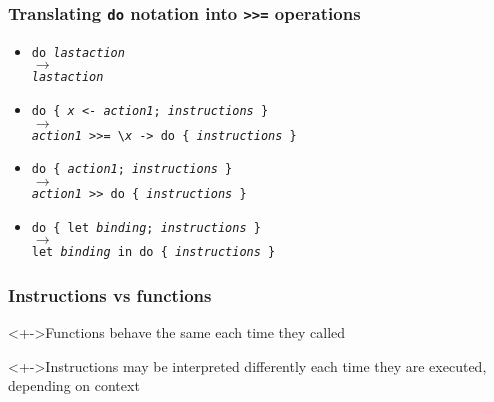 \documentclass{beamer}
\begin{document}
\begin{frame}
  \frametitle{Translating \texttt{do} notation into \texttt{>>=} operations}
  \begin{itemize}
  \item \texttt{do \emph{lastaction}}
    \\ $\longrightarrow$
    \\ \texttt{\emph{lastaction}}
    \\[2ex]
  \item \texttt{do \{ \emph{x} <- \emph{action1}; \emph{instructions} \}}
    \\ $\longrightarrow$
    \\ \texttt{\emph{action1} >>= \textbackslash \emph{x} -> \texttt{do \{ \emph{instructions} \}}}
    \\[2ex]
  \item \texttt{do \{ \emph{action1}; \emph{instructions} \}}
    \\ $\longrightarrow$
    \\ \texttt{\emph{action1} >> \texttt{do \{ \emph{instructions} \}}}
    \\[2ex]
  \item \texttt{do \{ let \emph{binding}; \emph{instructions} \}}
    \\ $\longrightarrow$
    \\ \texttt{let \emph{binding} in do \{  \emph{instructions} \}}
  \end{itemize}
\end{frame}
\begin{frame}[fragile]
  \frametitle{Instructions vs functions}
  \begin{block}<+->{Functions}
    behave the same each time they called
  \end{block}
  \begin{block}<+->{Instructions}
    may be interpreted differently each time 
    they are executed, depending on context    
  \end{block}
\end{frame}
\end{document}

